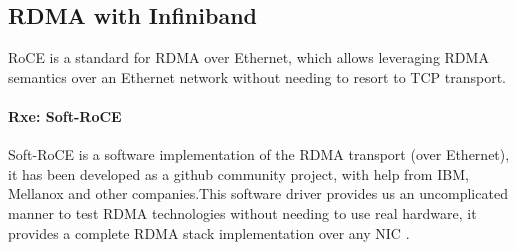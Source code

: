 \subsection{RDMA with Infiniband}

RoCE is a standard for RDMA over Ethernet, which allows leveraging RDMA semantics over an Ethernet network without needing
to resort to TCP transport. 
\paragraph{Rxe: Soft-RoCE}

Soft-RoCE is a software implementation of the RDMA transport (over Ethernet), it has been developed as a github 
community project, with help from IBM, Mellanox and other companies.This software driver provides us an 
uncomplicated manner to test RDMA technologies without needing to use real hardware, it provides a complete RDMA 
stack implementation over any NIC \cite{mellanox-community}.







